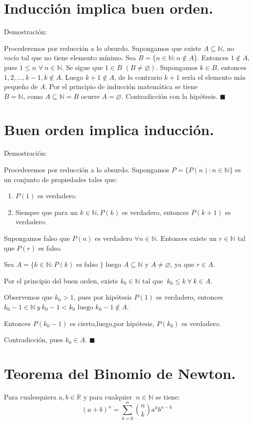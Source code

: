 \documentclass[12pt]{book}
\newcommand\R{{\mathbb R}}
\newcommand\N{{\mathbb N}}
\begin{document}
\section{Inducción implica buen orden.}
Demostración:

Procederemos por reducción a lo absurdo. Supongamos que existe $A\subseteq \N$, no vacío tal que no tiene elemento mínimo.
Sea $B=\lbrace n\in \N :n\notin{A} \rbrace$. Entonces $1\notin{A}$, pues $ 1\le{n}$ $\forall \ n\in \N$. Se sigue que $1\in{B}$ $(B\neq \varnothing)$. Supongamos $k\in{B}$, entonces $1,2,...,k-1,k \notin{A}$.
Luego $k+1\notin{A}$, de lo contrario $k+1$ sería el elemento más pequeño de \textit{A}. Por el principio de inducción matemática se tiene $B=\N \mbox{, como }A\subseteq{\mathbb{N}}=B\mbox{ ocurre }A=\varnothing$. Contradicción con la hipótesis. $\blacksquare$
\section{Buen orden implica inducción.}
Demostración:

Procederemos por reducción a lo absurdo. Supongamos $P=\lbrace P(n):n\in{\N}\rbrace$ es un conjunto de propiedades tales que:
\begin{enumerate}
\item $P(1)$ es verdadero.
\item Siempre que para un $k\in{\N},P(k)$ es verdadero, entonces $P(k+1)$ es verdadero.
\end{enumerate}
Supongamos falso que $P(n)$ es verdadero $\forall{n \in \N}$. Entonces existe un $r\in \N$ tal que $P(r)$ es falso.

Sea $A=\lbrace k \in \N:P(k)\mbox{ es falso }\rbrace$ luego $A\subseteq \N$ y $A\neq{\varnothing}$, ya que $r\in{A}$.

Por el principio del buen orden, existe $k_{0}\in \N\mbox{ tal que } \ k_{0}\le{k} \ \forall \ k\in{A}$.

Observemos que $k_{0}>1$, pues por hipótesis $P(1)$ es verdadero, entonces $k_{0}-1\in \N \ y \ k_{0}-1<k_{0}\mbox{ luego }k_{0}-1\not\in{A}$.

Entonces $P(k_{0}-1)$ es cierto,luego,por hipótesis, $P(k_{0})$ es verdadero.

Contradicción, pues $k_{0}\in{A}$. $\blacksquare$
\section{Teorema del Binomio de Newton.}
Para cualesquiera $a,b\in\R$ y para cualquier $\ n\in\N$ se tiene:$$(a+b)^n=\sum_{k=0}^n \binom{n}{k} a^kb^{n-k}$$
\end{document}
